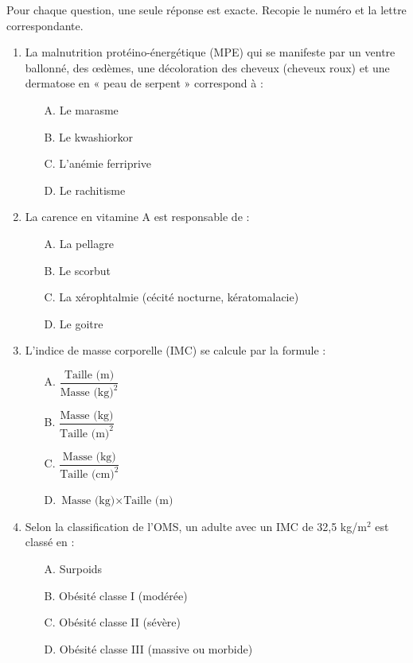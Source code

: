 \documentclass[11pt]{article}
\begin{document}
\begin{exercice}
Pour chaque question, une seule réponse est exacte. Recopie le numéro et la lettre correspondante.
\begin{enumerate}
    \item La malnutrition protéino-énergétique (MPE) qui se manifeste par un ventre ballonné, des œdèmes, une décoloration des cheveux (cheveux roux) et une dermatose en « peau de serpent » correspond à :
    \begin{itemize}
        \item[A.] Le marasme
        \item[B.] Le kwashiorkor
        \item[C.] L'anémie ferriprive
        \item[D.] Le rachitisme
    \end{itemize}
    \item La carence en vitamine A est responsable de :
    \begin{itemize}
        \item[A.] La pellagre
        \item[B.] Le scorbut
        \item[C.] La xérophtalmie (cécité nocturne, kératomalacie)
        \item[D.] Le goitre
    \end{itemize}
    \item L'indice de masse corporelle (IMC) se calcule par la formule :
    \begin{itemize}
        \item[A.] $\dfrac{\text{Taille (m)}}{\text{Masse (kg)}^2}$
        \item[B.] $\dfrac{\text{Masse (kg)}}{\text{Taille (m)}^2}$
        \item[C.] $\dfrac{\text{Masse (kg)}}{\text{Taille (cm)}^2}$
        \item[D.] $\text{Masse (kg)} \times \text{Taille (m)}$
    \end{itemize}
    \item Selon la classification de l'OMS, un adulte avec un IMC de 32,5 kg/m$^2$ est classé en :
    \begin{itemize}
        \item[A.] Surpoids
        \item[B.] Obésité classe I (modérée)
        \item[C.] Obésité classe II (sévère)
        \item[D.] Obésité classe III (massive ou morbide)

\end{itemize}
\end{enumerate}
\end{exercice}
\end{document}
